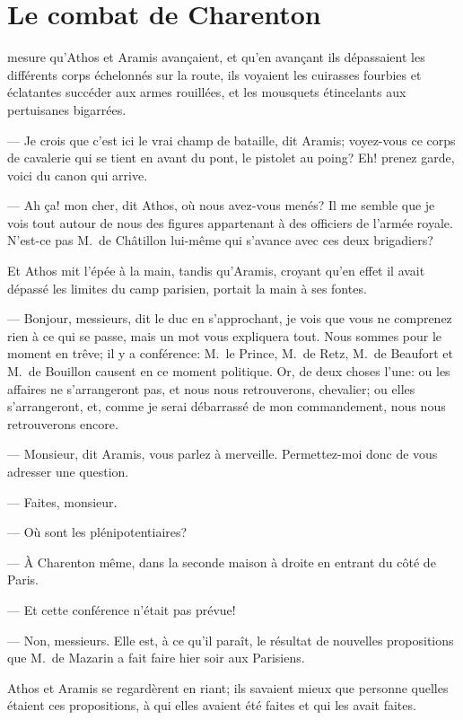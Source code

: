 \chapter{Le combat de Charenton}

\lettrine{}{} mesure qu'Athos et Aramis avançaient, et qu'en avançant ils dépassaient les différents corps échelonnés sur la route, ils voyaient les cuirasses fourbies et éclatantes succéder aux armes rouillées, et les mousquets étincelants aux pertuisanes bigarrées.

— Je crois que c'est ici le vrai champ de bataille, dit Aramis; voyez-vous ce corps de cavalerie qui se tient en avant du pont, le pistolet au poing? Eh! prenez garde, voici du canon qui arrive.

— Ah ça! mon cher, dit Athos, où nous avez-vous menés? Il me semble que je vois tout autour de nous des figures appartenant à des officiers de l'armée royale. N'est-ce pas M.~de Châtillon lui-même qui s'avance avec ces deux brigadiers?

Et Athos mit l'épée à la main, tandis qu'Aramis, croyant qu'en effet il avait dépassé les limites du camp parisien, portait la main à ses fontes.

— Bonjour, messieurs, dit le duc en s'approchant, je vois que vous ne comprenez rien à ce qui se passe, mais un mot vous expliquera tout. Nous sommes pour le moment en trêve; il y a conférence: M.~le Prince, M.~de Retz, M.~de Beaufort et M.~de Bouillon causent en ce moment politique. Or, de deux choses l'une: ou les affaires ne s'arrangeront pas, et nous nous retrouverons, chevalier; ou elles s'arrangeront, et, comme je serai débarrassé de mon commandement, nous nous retrouverons encore.

— Monsieur, dit Aramis, vous parlez à merveille. Permettez-moi donc de vous adresser une question.

— Faites, monsieur.

— Où sont les plénipotentiaires?

— À Charenton même, dans la seconde maison à droite en entrant du côté de Paris.

— Et cette conférence n'était pas prévue!

— Non, messieurs. Elle est, à ce qu'il paraît, le résultat de nouvelles propositions que M.~de Mazarin a fait faire hier soir aux Parisiens.

Athos et Aramis se regardèrent en riant; ils savaient mieux que personne quelles étaient ces propositions, à qui elles avaient été faites et qui les avait faites.

